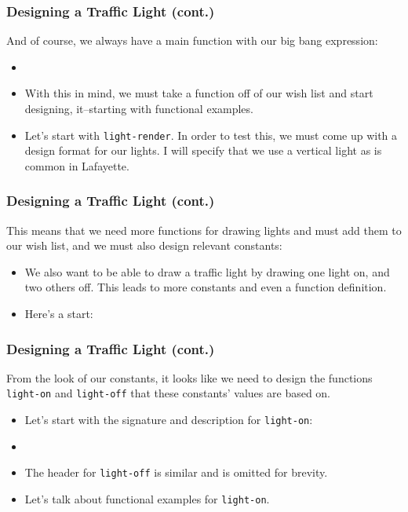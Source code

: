 \documentclass{beamer}
\begin{document}
\begin{frame}
  \frametitle{Designing a Traffic Light (cont.)}
  And of course, we always have a main function with our big bang expression:
  \begin{itemize}
  \item<2-> \mainLight
  \item<3-> With this in mind, we must take a function off of our wish list and start designing, it--starting with functional examples.
  \item<4-> Let's start with \texttt{light-render}. In order to test this, we must come up with a design format for our lights.
    I will specify that we use a vertical light as is common in Lafayette.    
  \end{itemize}
\end{frame}

\begin{frame}
  \frametitle{Designing a Traffic Light (cont.)}
  This means that we need more functions for drawing lights and must add them to our wish list, and we must also design relevant constants:
  \lightBox
  \begin{itemize}
    \item<2-> We also want to be able to draw a traffic light by drawing one light on, and two others off. This leads to more constants
      and even a function definition.
    \item<3-> Here's a start: \lights
  \end{itemize}
\end{frame}




\begin{frame}
  \frametitle{Designing a Traffic Light (cont.)}
  From the look of our constants, it looks like we need to design the
  functions \texttt{light-on} and
  \texttt{light-off} that these constants' values are based on.
  \begin{itemize}
  \item<2-> Let's start with the signature and description for
    \texttt{light-on}:
  \item<3-> \lightOnHeader
  \item<4-> The header for \texttt{light-off} is similar
    and is omitted for brevity.
  \item<5-> Let's talk about functional examples for
    \texttt{light-on}.
  \end{itemize}
\end{frame}
\end{document}

